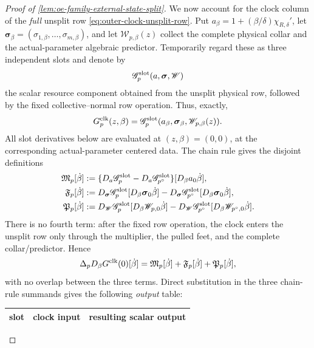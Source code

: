 \begin{proof}[Proof of
\cref{lem:oe-family-external-state-split}]
We now account for the clock column of the \emph{full} unsplit row
\cref{eq:outer-clock-unsplit-row}.  Put
\(a_\beta=1+(\beta/\delta)\chi_{R,\delta}'\), let
\(\boldsymbol\sigma_\beta=(\sigma_{1,\beta},\ldots,
\sigma_{m,\beta})\), and let \(\mathscr W_{p,\beta}(z)\) collect the
complete physical collar and the actual-parameter algebraic predictor.
Temporarily regard these as three independent slots and denote by
\[
 \mathscr G_p^{\rm slot}
       (a,\boldsymbol\sigma,\mathscr W)
\]
the scalar resource component obtained from the unsplit physical row,
followed by the fixed collective--normal row operation.  Thus, exactly,
\[
 G_p^{\rm clk}(z,\beta)
 =\mathscr G_p^{\rm slot}
   (a_\beta,\boldsymbol\sigma_\beta,\mathscr W_{p,\beta}(z)).
\]
All slot derivatives below are evaluated at \((z,\beta)=(0,0)\), at
the corresponding actual-parameter centered data.  The chain rule gives
the disjoint definitions
\begin{align}
 \mathfrak M_p[\dot\beta]
 &:=
 \{D_a\mathscr G_p^{\rm slot}
       -D_a\mathscr G_{p^\circ}^{\rm slot}\}
       [D_\beta a_0\dot\beta],\notag\\
 \mathfrak F_p[\dot\beta]
 &:=
 D_{\boldsymbol\sigma}\mathscr G_p^{\rm slot}
       [D_\beta\boldsymbol\sigma_0\dot\beta]
 -D_{\boldsymbol\sigma}\mathscr G_{p^\circ}^{\rm slot}
       [D_\beta\boldsymbol\sigma_0\dot\beta],\notag\\
 \mathfrak P_p[\dot\beta]
 &:=
 D_{\mathscr W}\mathscr G_p^{\rm slot}
       [D_\beta\mathscr W_{p,0}\dot\beta]
 -D_{\mathscr W}\mathscr G_{p^\circ}^{\rm slot}
       [D_\beta\mathscr W_{p^\circ,0}\dot\beta].
                                                        \label{eq:proof-oe-family-mixed-resource-clock-slots}
\end{align}
There is no fourth term: after the fixed row operation, the clock enters
the unsplit row only through the multiplier, the pulled feet, and the
complete collar/predictor.  Hence
\begin{equation}
 \Delta_pD_\beta G^{\rm clk}(0)[\dot\beta]
 =\mathfrak M_p[\dot\beta]
  +\mathfrak F_p[\dot\beta]
  +\mathfrak P_p[\dot\beta],                    \label{eq:proof-oe-family-mixed-resource-clock-partition}
\end{equation}
with no overlap between the three terms.  Direct substitution in the
three chain-rule summands gives the following \emph{output} table:
\begin{center}
\begin{tabular}{c|c|c}
slot & clock input & resulting scalar output\\ \hline

\end{tabular}
\end{center}
\end{proof}
